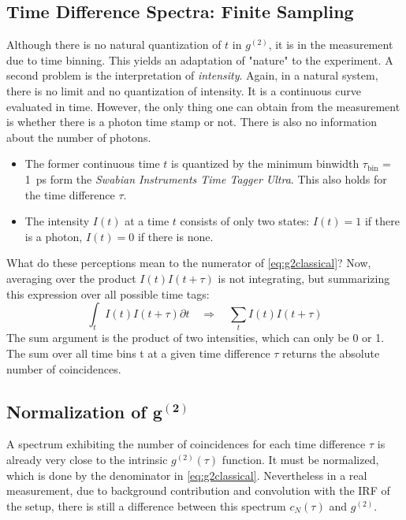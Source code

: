 \subsection{Time Difference Spectra: Finite Sampling}
Although there is no natural quantization of $t$ in $g^{(2)}$, it is in the measurement due to time binning. This yields an adaptation of "nature" to the experiment. A second problem is the interpretation of \textit{intensity}. Again, in a natural system, there is no limit and no quantization of intensity. It is a continuous curve evaluated in time. However, the only thing one can obtain from the measurement is whether
there is a photon time stamp or not. There is also no information about the number of photons.
\begin{itemize}
	\item The former continuous time $t$ is quantized by the minimum binwidth $\tau_\mathrm{bin}$ = \SI{1}{\ps} form the \textit{Swabian Instruments Time Tagger Ultra}. This also holds for the time difference $\tau$.
	\item The intensity $I(t)$ at a time $t$ consists of only two states: $I(t) = 1$ if there is a photon, $I(t) = 0$ if there is none.
\end{itemize}
What do these perceptions mean to the numerator of \cref{eq:g2classical}? Now, averaging over the product $I(t)I(t + \tau)$ is not integrating, but summarizing this expression over all possible time tags:
\begin{equation}\label{eq:g2finite1}
	\int_{t}I(t)I(t+\tau)\partial t\quad\Rightarrow\quad\sum_t I(t)I(t+\tau)
\end{equation}
The sum argument is the product of two intensities, which can only be \num{0} or \num{1}. The sum over all time bins t at a given time difference $\tau$ returns the absolute number of coincidences.

\subsection{Normalization of \texorpdfstring{$\boldsymbol{g^{(2)}}$}{g2 Function}}
A spectrum exhibiting the number of coincidences for each time difference $\tau$ is already very close to the intrinsic $g^{(2)}(\tau)$ function. It must be normalized, which is done by the denominator in \cref{eq:g2classical}. Nevertheless in a real measurement, due to background contribution and convolution with the \ac{IRF} of the setup, there is still a difference between this spectrum $c_N(\tau)$ and $g^{(2)}$. 

